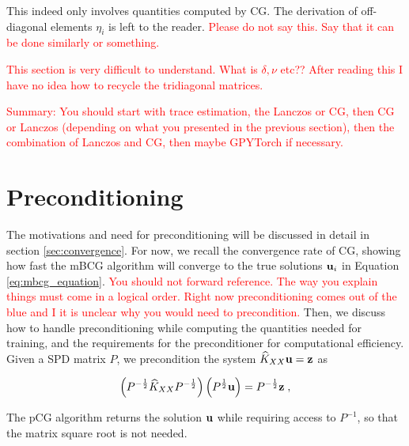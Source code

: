 \documentclass{article}
\begin{document}
{This indeed only involves quantities computed by CG. The derivation of off-diagonal elements $\eta_i$ is left to the reader. \textcolor{red}{Please do not say this. Say that it can be done similarly or something.}

\textcolor{red}{This section is very difficult to understand. What is $\delta,\nu$ etc?? After reading this I have no idea how to recycle the tridiagonal matrices. }

\textcolor{red}{Summary: You should start with trace estimation, the Lanczos or CG, then CG or Lanczos (depending on what you presented in the previous section), then the combination of Lanczos and CG, then maybe GPYTorch if necessary.}

\section{Preconditioning} \label{sec:precond}
The motivations and need for preconditioning will be discussed in detail in section \ref{sec:convergence}. For now, we recall the convergence rate of CG, showing how fast the mBCG algorithm will converge to the true solutions $\boldsymbol{\mathbf{u}}_i$ in Equation \eqref{eq:mbcg_equation}. \textcolor{red}{You should not forward reference. The way you explain things must come in a logical order. Right now preconditioning comes out of the blue and I it is unclear why you would need to precondition. } Then, we discuss how to handle preconditioning while computing the quantities needed for training, and the requirements for the preconditioner for computational efficiency. Given a SPD matrix $P$, we precondition the system $\widehat K_{XX} \boldsymbol{\mathbf{u}} = \boldsymbol{\mathbf{z}}$ as

\begin{equation} \label{eq:precond_linsys}
    \left( P^{-\frac 1 2} \widehat K_{XX} P^{-\frac 1 2} \right) \left( P^{\frac 1 2} \boldsymbol{\mathbf{u}}\right) = P^{-\frac 1 2} \boldsymbol{\mathbf{z}} \; ,
\end{equation}

The pCG algorithm returns the solution $\boldsymbol{\mathbf{u}}$ while requiring access to $P^{-1}$, so that the matrix square root is not needed. 

}
\end{document}
